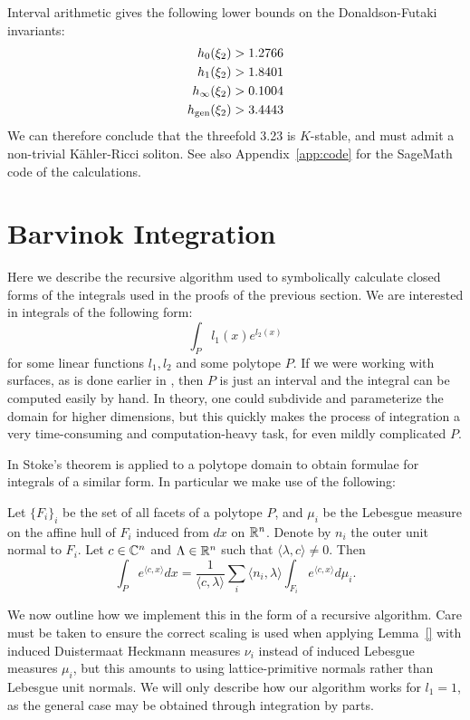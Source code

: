 \begin{example}
Interval arithmetic gives the following lower bounds on the Donaldson-Futaki invariants:
\begin{align*}
h_0(\xi_2) &> 1.2766 \\
h_1(\xi_2) &> 1.8401 \\
h_\infty(\xi_2) &> 0.1004 \\
h_{\operatorname{gen}}(\xi_2) &> 3.4443
\end{align*}
We can therefore conclude that the threefold 3.23 is \(K\)-stable, and must admit a non-trivial K\"ahler-Ricci soliton. See also Appendix~\ref{app:code} for the SageMath code of the calculations.
\end{example}

\section{Barvinok Integration} \label{sec:barvinok}
Here we describe the recursive algorithm used to symbolically calculate closed forms of the integrals used in the proofs of the previous section. We are interested in integrals of the following form:
\begin{equation} \label{eq:barintegral1}
\int_{P} l_1(x) e^{l_2(x)}
\end{equation}
for some linear functions \(l_1,l_2\) and some polytope \(P\). If we were working with surfaces, as is done earlier in \cite{cable2018classification}, then \(P\) is just an interval and the integral can be computed easily by hand. In theory, one could subdivide and parameterize the domain for higher dimensions, but this quickly makes the process of integration a very time-consuming and computation-heavy task, for even mildly complicated \(P\).

In \cite{Barvinok1992} Stoke's theorem is applied to a polytope domain to obtain formulae for integrals of a similar form. In particular we make use of the following:
\begin{lemma} \label{lem:bar}
Let \(\{F_i\}_i\) be the set of all facets of a polytope \(P\), and \(\mu_i\) be the Lebesgue measure on the affine hull of \(F_i\) induced from \(dx\) on \(\mathbb{R}^n\). Denote by \(n_i\) the outer unit normal to \(F_i\). Let \(c \in \mathbb{C}^n\) and \(\Lambda \in \mathbb{R}^n\) such that \(\langle \lambda, c \rangle \neq 0\). Then
\begin{equation} \label{eq:barv}
\int_P e^{\langle c, x \rangle} dx = \frac{1}{\langle c , \lambda \rangle} \sum_i   \langle n_i, \lambda \rangle \int_{F_i} e^{\langle c, x \rangle} d \mu_i.
\end{equation}
\end{lemma}
We now outline how we implement this in the form of a recursive algorithm. Care must be taken to ensure the correct scaling is used when applying Lemma~\ref{} with induced Duistermaat Heckmann measures \(\nu_i\) instead of induced Lebesgue measures \(\mu_i\), but this amounts to using lattice-primitive normals rather than Lebesgue unit normals. We will only describe how our algorithm works for \(l_1 = 1\), as the general case may be obtained through integration by parts.

